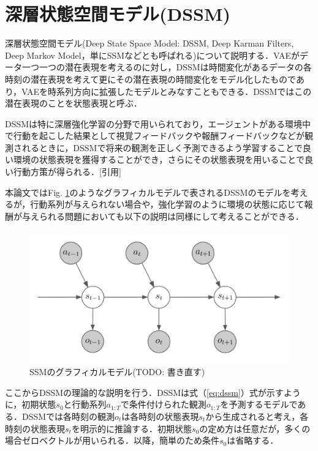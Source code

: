 \clearpage
\section{深層状態空間モデル(DSSM)}
\label{section:dssm}

深層状態空間モデル(Deep State Space Model: DSSM, Deep Karman Filters, Deep Markov Model，単にSSMなどとも呼ばれる)について説明する．VAEがデータ一つ一つの潜在表現を考えるのに対し，DSSMは時間変化があるデータの各時刻の潜在表現を考えて更にその潜在表現の時間変化をモデル化したものであり，VAEを時系列方向に拡張したモデルとみなすこともできる．DSSMではこの潜在表現のことを状態表現と呼ぶ．

DSSMは特に深層強化学習の分野で用いられており，エージェントがある環境中で行動を起こした結果として視覚フィードバックや報酬フィードバックなどが観測されるときに，DSSMで将来の観測を正しく予測できるよう学習することで良い環境の状態表現を獲得することができ，さらにその状態表現を用いることで良い行動方策が得られる．[引用]

\vspace{\baselineskip}
本論文ではFig. \ref{fig:ssm}のようなグラフィカルモデルで表されるDSSMのモデルを考えるが，行動系列が与えられない場合や，強化学習のように環境の状態に応じて報酬が与えられる問題においても以下の説明は同様にして考えることができる．

\begin{figure}[bp]
  \begin{center}
    \includegraphics[width=\linewidth]{./figures/dssm.png}
    \caption{SSMのグラフィカルモデル(TODO: 書き直す)}
    \label{fig:ssm}
  \end{center}
\end{figure}

\vspace{\baselineskip}
ここからDSSMの理論的な説明を行う．DSSMは式（\ref{eq:dssm}）式が示すように，初期状態$s_0$と行動系列$a_{1:T}$で条件付けられた観測$o_{1:T}$を予測するモデルである．DSSMでは各時刻の観測$o_t$は各時刻の状態表現$s_t$から生成されると考え，各時刻の状態表現$s_t$を明示的に推論する．初期状態$s_0$の定め方は任意だが，多くの場合ゼロベクトルが用いられる．以降，簡単のため条件$s_0$は省略する．

